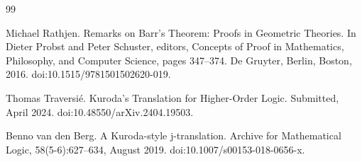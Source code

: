 \begin{thebibliography}{99}
\par\noindent    Michael Rathjen.  Remarks on Barr’s Theorem: Proofs in Geometric Theories.  In Dieter Probst and Peter Schuster, editors, Concepts of Proof in Mathematics, Philosophy, and Computer Science, pages 347–374. De Gruyter, Berlin, Boston, 2016.  doi:10.1515/9781501502620-019.  

\par\noindent    Thomas Traversié.  Kuroda’s Translation for Higher-Order Logic.  Submitted, April 2024.  doi:10.48550/arXiv.2404.19503.  

\par\noindent    Benno van den Berg.  A Kuroda-style j-translation.  Archive for Mathematical Logic, 58(5-6):627–634, August 2019.  doi:10.1007/s00153-018-0656-x.  

\end{thebibliography}
